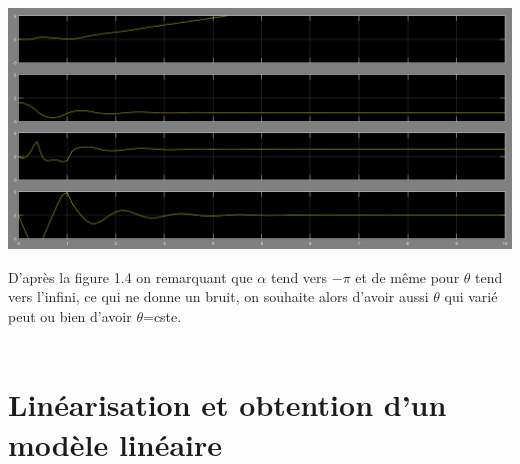\documentclass[12pt, a4paper, openany]{report}
\begin{document}
\begin{center}
\includegraphics[scale=0.4]{alpha=-1.PNG}
\label{fig1} 
\end{center}

D’après la figure 1.4 on remarquant que $\alpha$ tend vers $-\pi$ et de même pour $\theta$
tend vers l'infini, ce qui ne donne un bruit, on souhaite alors d'avoir aussi $\theta$ qui varié peut ou bien d'avoir $\theta$=cste.\\\\

\section{Linéarisation et obtention d'un modèle linéaire}










	
\end{document}
